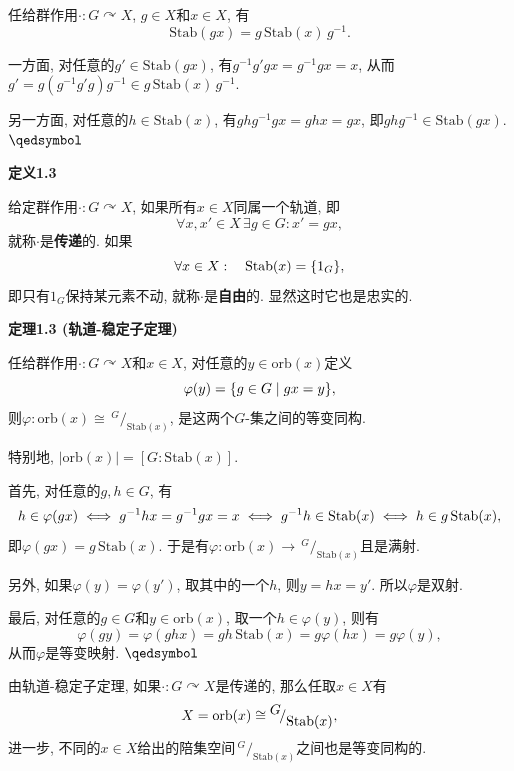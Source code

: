 \documentclass[UTF8]{ctexart}
\begin{document}
任给群作用$\cdot:G\curvearrowright X$, $g\in X$和$x\in X$, 有
\[
    \mathrm{Stab}(gx)=g\,\mathrm{Stab}(x)\,g^{-1}.
\]


一方面, 对任意的$g'\in\mathrm{Stab}(gx)$, 有$g^{-1}g'gx=g^{-1}gx=x$,
从而$g'=g(g^{-1}g'g)g^{-1}\in g\,\mathrm{Stab}(x)\,g^{-1}$.

另一方面, 对任意的$h\in\mathrm{Stab}(x)$, 有$ghg^{-1}gx=ghx=gx$,
即$ghg^{-1}\in\mathrm{Stab}(gx)$. \hfill $\qedsymbol$

\vspace{10pt}

\hypertarget{sec:定义1.3}{}
\noindent\textbf{定义1.3}

给定群作用$\cdot:G\curvearrowright X$, 如果所有$x\in X$同属一个轨道, 即
\[
    \forall x,x'\in X\,\exists g\in G:x'=gx,
\]
就称$\cdot$是\textbf{传递}的. 如果
\[
    \forall x\in X:\quad\mathrm{Stab}(x)=\{1_G\},\\[-3pt]
\]
即只有$1_G$保持某元素不动, 就称$\cdot$是\textbf{自由}的.
显然这时它也是忠实的.





\newpage

\hypertarget{sec:定理1.3}{}
\noindent\textbf{定理1.3 (轨道-稳定子定理)}

任给群作用$\cdot:G\curvearrowright X$和$x\in X$,
对任意的$y\in\mathrm{orb}(x)$定义
\[
    \varphi(y)=\{g\in G\mid gx=y\},\\[3pt]
\]
则$\varphi:\mathrm{orb}(x)\cong\,\!^{\displaystyle G}\!
/_{\displaystyle\mathrm{Stab}(x)}$, 是这两个$G$-集之间的等变同构.

\vspace{5pt}
特别地, $|\mathrm{orb}(x)|=[G:\mathrm{Stab}(x)]$.

\vspace{3pt}

首先, 对任意的$g,h\in G$, 有
\[
    h\in\varphi(gx)\iff g^{-1}hx=g^{-1}gx=x\iff
    g^{-1}h\in\mathrm{Stab}(x)\iff h\in g\,\mathrm{Stab}(x),\\[3pt]
\]
即$\varphi(gx)=g\,\mathrm{Stab}(x)$.
于是有$\varphi:\mathrm{orb}(x)\to\,\!^{\displaystyle G}\!
/_{\displaystyle\mathrm{Stab}(x)}$且是满射.

\vspace{3pt}
另外, 如果$\varphi(y)=\varphi(y')$, 取其中的一个$h$,
则$y=hx=y'$. 所以$\varphi$是双射.

最后, 对任意的$g\in G$和$y\in\mathrm{orb}(x)$, 取一个$h\in\varphi(y)$, 则有
\[
    \varphi(gy)=\varphi(ghx)=gh\,\mathrm{Stab}(x)=g\varphi(hx)=g\varphi(y),
\]
从而$\varphi$是等变映射. \hfill $\qedsymbol$

\vspace{15pt}

由轨道-稳定子定理, 如果$\cdot:G\curvearrowright X$是传递的,
那么任取$x\in X$有
\vspace{3pt}
\[
    X=\mathrm{orb}(x)\cong\,\!^{\displaystyle G}\!
    /_{\displaystyle\mathrm{Stab}(x)},\\[3pt]
\]
进一步, 不同的$x\in X$给出的陪集空间$\,\!^{\displaystyle G}\!
/_{\displaystyle\mathrm{Stab}(x)}$之间也是等变同构的.
\end{document}

